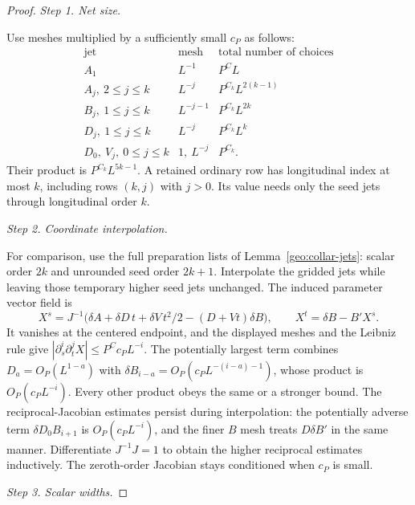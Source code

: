 \documentclass[11pt]{amsart}
\theoremstyle{definition}
\theoremstyle{remark}
\numberwithin{equation}{section}
\begin{document}
\begin{proof}
\par\medskip\noindent\textit{Step 1. Net size.}\par\nobreak\smallskip

Use meshes multiplied by a sufficiently small $c_P$ as follows:
\[
\begin{array}{c|c|c}
\text{jet}&\text{mesh}&\text{total number of choices}\\\hline
A_1&L^{-1}&P^CL\\
A_j,\ 2\le j\le k&L^{-j}&P^{C_k}L^{2(k-1)}\\
B_j,\ 1\le j\le k&L^{-j-1}&P^{C_k}L^{2k}\\
D_j,\ 1\le j\le k&L^{-j}&P^{C_k}L^k\\
D_0,\ V_j,\ 0\le j\le k&1,\ L^{-j}&P^{C_k}.
\end{array}
\]
Their product is $P^{C_k}L^{5k-1}$. A retained ordinary row has longitudinal index at most $k$, including rows $(k,j)$ with $j>0$. Its value needs only the seed jets through longitudinal order $k$.

\par\medskip\noindent\textit{Step 2. Coordinate interpolation.}\par\nobreak\smallskip

For comparison, use the full preparation lists of Lemma~\ref{geo:collar-jets}: scalar order $2k$ and unrounded seed order $2k+1$. Interpolate the gridded jets while leaving those temporary higher seed jets unchanged. The induced parameter vector field is
\[
X^s=J^{-1}\bigl(\delta A+\delta D\,t+\delta V\,t^2/2-(D+Vt)\delta B\bigr),\qquad X^t=\delta B-B'X^s.
\]
It vanishes at the centered endpoint, and the displayed meshes and the Leibniz rule give $|\partial_s^i\partial_t^jX|\le P^Cc_PL^{-i}$. The potentially largest term combines $D_a=O_P(L^{1-a})$ with $\delta B_{i-a}=O_P(c_PL^{-(i-a)-1})$, whose product is $O_P(c_PL^{-i})$. Every other product obeys the same or a stronger bound. The reciprocal-Jacobian estimates persist during interpolation: the potentially adverse term $\delta D_0B_{i+1}$ is $O_P(c_PL^{-i})$, and the finer $B$ mesh treats $D\delta B'$ in the same manner. Differentiate $J^{-1}J=1$ to obtain the higher reciprocal estimates inductively. The zeroth-order Jacobian stays conditioned when $c_P$ is small.

\par\medskip\noindent\textit{Step 3. Scalar widths.}\par\nobreak\smallskip


\end{proof}
\end{document}
